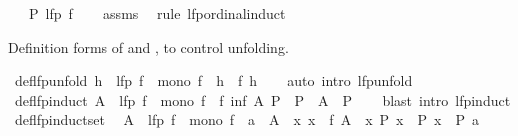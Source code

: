 \begin{isabellebody}
\ \ \ {\isachardoublequoteopen}P\ {\isacharparenleft}{\kern0pt}lfp\ f{\isacharparenright}{\kern0pt}{\isachardoublequoteclose}\isanewline
%
\isadelimproof
\ \ %
\endisadelimproof
%
\isatagproof
{}\isamarkupfalse%
\ assms\ \isamarkupfalse%
\ {\isacharparenleft}{\kern0pt}rule\ lfp{\isacharunderscore}{\kern0pt}ordinal{\isacharunderscore}{\kern0pt}induct{\isacharparenright}{\kern0pt}%
\endisatagproof
{\isafoldproof}%
%
\isadelimproof
%
\endisadelimproof
%
\begin{isamarkuptext}%
Definition forms of  and , to control unfolding.%
\end{isamarkuptext}\isamarkuptrue%
\isamarkupfalse%
\ def{\isacharunderscore}{\kern0pt}lfp{\isacharunderscore}{\kern0pt}unfold{\isacharcolon}{\kern0pt}\ {\isachardoublequoteopen}h\ {\isasymequiv}\ lfp\ f\ {\isasymLongrightarrow}\ mono\ f\ {\isasymLongrightarrow}\ h\ {\isacharequal}{\kern0pt}\ f\ h{\isachardoublequoteclose}\isanewline
%
\isadelimproof
\ \ %
\endisadelimproof
%
\isatagproof
{}\isamarkupfalse%
\ {\isacharparenleft}{\kern0pt}auto\ intro{\isacharbang}{\kern0pt}{\isacharcolon}{\kern0pt}\ lfp{\isacharunderscore}{\kern0pt}unfold{\isacharparenright}{\kern0pt}%
\endisatagproof
{\isafoldproof}%
%
\isadelimproof
\isanewline
%
\endisadelimproof
\isanewline
{}\isamarkupfalse%
\ def{\isacharunderscore}{\kern0pt}lfp{\isacharunderscore}{\kern0pt}induct{\isacharcolon}{\kern0pt}\ {\isachardoublequoteopen}A\ {\isasymequiv}\ lfp\ f\ {\isasymLongrightarrow}\ mono\ f\ {\isasymLongrightarrow}\ f\ {\isacharparenleft}{\kern0pt}inf\ A\ P{\isacharparenright}{\kern0pt}\ {\isasymle}\ P\ {\isasymLongrightarrow}\ A\ {\isasymle}\ P{\isachardoublequoteclose}\isanewline
%
\isadelimproof
\ \ %
\endisadelimproof
%
\isatagproof
{}\isamarkupfalse%
\ {\isacharparenleft}{\kern0pt}blast\ intro{\isacharcolon}{\kern0pt}\ lfp{\isacharunderscore}{\kern0pt}induct{\isacharparenright}{\kern0pt}%
\endisatagproof
{\isafoldproof}%
%
\isadelimproof
\isanewline
%
\endisadelimproof
\isanewline
{}\isamarkupfalse%
\ def{\isacharunderscore}{\kern0pt}lfp{\isacharunderscore}{\kern0pt}induct{\isacharunderscore}{\kern0pt}set{\isacharcolon}{\kern0pt}\isanewline
\ \ {\isachardoublequoteopen}A\ {\isasymequiv}\ lfp\ f\ {\isasymLongrightarrow}\ mono\ f\ {\isasymLongrightarrow}\ a\ {\isasymin}\ A\ {\isasymLongrightarrow}\ {\isacharparenleft}{\kern0pt}{\isasymAnd}x{\isachardot}{\kern0pt}\ x\ {\isasymin}\ f\ {\isacharparenleft}{\kern0pt}A\ {\isasyminter}\ {\isacharbraceleft}{\kern0pt}x{\isachardot}{\kern0pt}\ P\ x{\isacharbraceright}{\kern0pt}{\isacharparenright}{\kern0pt}\ {\isasymLongrightarrow}\ P\ x{\isacharparenright}{\kern0pt}\ {\isasymLongrightarrow}\ P\ a{\isachardoublequoteclose}\isanewline

\end{isabellebody}
